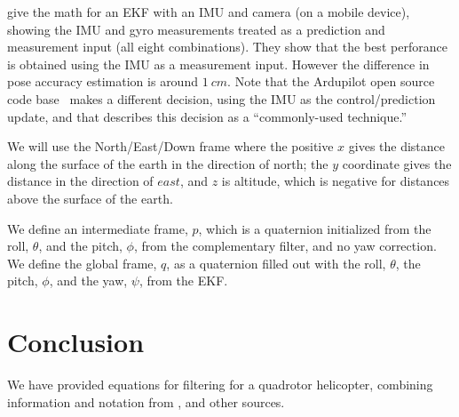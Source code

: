 \documentclass{article}
\begin{document}
\citet{erdem2015fusing} give the math for an EKF with an IMU and
camera (on a mobile device), showing the IMU and gyro measurements
treated as a prediction and measurement input (all eight
combinations).  They show that the best perforance is obtained using
the IMU as a measurement input.  However the difference in pose
accuracy estimation is around $\SI{1}{cm}$.  Note that the Ardupilot
open source code base~\citep{ardupilotekf} makes a different decision,
using the IMU as the control/prediction update, and that
\citet{bry2012state} describes this decision as a ``commonly-used
technique.''

We will use the North/East/Down frame where the positive $x$ gives the distance
along the surface of the earth in the direction of north; the $y$
coordinate gives the distance in the direction of $east$,
and $z$ is altitude, which is negative for distances above the surface
of the earth.

We define an intermediate frame, $p$, which is a quaternion
initialized from the roll, $\theta$, and the pitch, $\phi$, from the
complementary filter, and no yaw correction.  We define the global
frame, $q$, as a quaternion filled out with the roll, $\theta$, the
pitch, $\phi$, and the yaw, $\psi$, from the EKF.

\section{Conclusion}

We have provided equations for filtering for a quadrotor helicopter,
combining information and notation from
\citet{thrun2005probabilistic}, \citet{quan2017introduction} and other
sources.  




\end{document}
